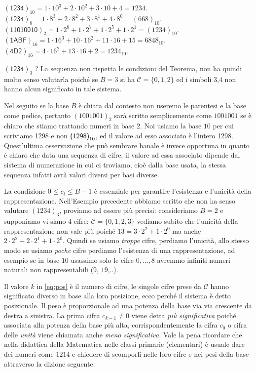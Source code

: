 \begin{ex} $(\textsf{1234})_{10} = 1\cdot 10^3+2\cdot 10^2 + 3 \cdot 10 + 4 =
1234$. $(\textsf{1234})_8 = 1\cdot 8^3+2\cdot 8^2+3\cdot 8^1+4\cdot 8^0 =
(668)_{10}$. $(\textsf{11010010})_2 = 1\cdot 2^8 + 1\cdot 2^7 + 1\cdot 2^5 +
1\cdot 2^1 = (1234)_{10}$. $(\textsf{1ABF})_{16} = 1\cdot 16^3 + 10\cdot 16^2 +
11 \cdot 16 + 15 = 6848_{10}$. $(\textsf{4D2})_{16} = 4\cdot 16^2 + 13\cdot 16
+ 2 = 1234_{10}$.

\noindent $(\textsf{1234})_3$ ? La sequenza non rispetta le condizioni del
Teorema, non ha quindi molto senso valutarla poiché se $B = 3$ si ha
$\mathcal{C} = \{ 0, 1, 2 \}$ ed i simboli \textsf{3,4} non hanno alcun
significato in tale sistema. \end{ex}

Nel seguito se la base $B$ è chiara dal contesto non useremo le parentesi e la
base come pedice, pertanto $ (1001001)_2$ sarà scritto semplicemente come
$1001001$ se è chiaro che stiamo trattando numeri in base $2$. Noi usiamo
la base $10$ per cui scriviamo \textsf{1298} e non
$\mbox{\textsf{(1298)}}_{10}$, ed il valore ad esso associato è l'intero 1298.
Quest'ultima osservazione che può sembrare banale è invece opportuna in quanto
è chiaro che data una sequenza di cifre, il valore ad essa associato dipende
dal sistema di numerazione in cui ci troviamo, cioè dalla base usata, la stessa
sequenza infatti avrà valori diversi per basi diverse.

La condizione $0 \leq c_i \leq B-1$ è essenziale per garantire l'esistenza e l'unicità
della rappresentazione. Nell'Esempio precedente abbiamo scritto che non ha
senso valutare $(1234)_3$, proviamo ad essere più precisi: consideriamo $B = 2$
e supponiamo vi siano $4$ cifre: $\mathcal{C} = \{ 0, 1, 2, 3 \}$ vediamo
subito che l'unicità della rappresentazione non vale più poiché $13 = 3\cdot
2^2 + 1 \cdot 2^0$ ma anche $2\cdot 2^2 + 2\cdot 2^1 + 1\cdot 2^0$. Quindi se
usiamo \emph{troppe} cifre, perdiamo l'unicità, allo stesso modo se usiamo
\emph{poche} cifre perdiamo l'esistenza di una rappresentazione, ad esempio se
in base $10$ usassimo solo le cifre $0,\ldots,8$ avremmo infiniti numeri
naturali non rappresentabili ($9$, $19$,..).

Il valore $k$ in \eqref{eq:pos} è il numero di cifre, le singole cifre prese da
$\mathcal{C}$ hanno significato diverso in base alla loro posizione, ecco
perché il sistema è detto posizionale. Il peso è proporzionale ad una potenza
della base via via crescente da destra a sinistra. La prima cifra $c_{k-1} \neq
0$ viene detta \emph{più significativa} poiché associata alla potenza della
base più alta, corrispondentemente la cifra $c_0$ o cifra delle \emph{unità}
viene chiamata anche \emph{meno significativa}. Vale la pena ricordare che
nella didattica della Matematica nelle classi primarie (elementari) è usuale
dare dei numeri come $1214$ e chiedere di scomporli nelle loro cifre e nei pesi
della base attraverso la dizione seguente:

